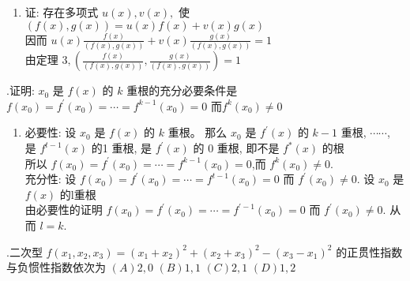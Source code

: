 \documentclass{article}
\begin{document}
\begin{enumerate}[\qquad 证：]
    \item 证: 存在多项式 $u(x), v(x),$ 使 $(f(x), g(x))=u(x) f(x)+v(x) g(x)$ \\
          因而 $u(x) \frac{f(x)}{(f(x), g(x))}+v(x) \frac{g(x)}{(f(x), g(x))}=1$ \\
          由定理 $3, \left(\frac{f(x)}{(f(x),g(x))},\frac{g(x)}{(f(x), g(x))}\right)=1$
\end{enumerate}

\vspace{1ex}
{.}证明: $x_{0}$ 是 $f(x)$ 的 $k$ 重根的充分必要条件是 $f\left(x_{0}\right)=f^{\prime}\left(x_{0}\right)=\cdots=f^{k-1}\left(x_{0}\right)=0$ 而$f^{k}\left(x_{0}\right) \neq 0$

\begin{enumerate}[\qquad 证：]
    \item {\heiti 必要性:} 设 $x_{0}$ 是 $f(x)$ 的 $k$ 重根。 那么 $x_{0}$ 是 $f^{\prime}(x)$ 的 $k-1$ 重根, $\cdots \cdots$, 是 $f^{t-1}(x)$ 的1 重根, 是 $f^{\prime}(x)$ 的 0 重根, 即不是 $f^{*}(x)$ 的根 \\
          所以 $f\left(x_{0}\right)=f^{\prime}\left(x_{0}\right)=\cdots=f^{k-1}\left(x_{0}\right)=0$,而 $f^{k}\left(x_{0}\right) \neq 0 .$ \\
          {\heiti 充分性: } 设 $f(x_{0})=f^{\prime}\left(x_{0}\right)=\cdots=f^{t-1}\left(x_{0}\right)=0$ 而 $f^{\prime}\left(x_{0}\right) \neq 0 .$ 设 $x_{0}$ 是 $f(x)$ 的l重根 \\
          由必要性的证明 $f\left(x_{0}\right)=f^{\prime}\left(x_{0}\right)=\cdots=f^{\prime-1}\left(x_{0}\right)=0$ 而 $f^{\prime}\left(x_{0}\right) \neq 0 .$ 从而 $l=k .$
\end{enumerate}

\vspace{1ex}
{.}二次型 $f\left(x_{1}, x_{2}, x_{3}\right)=\left(x_{1}+x_{2}\right)^{2}+\left(x_{2}+x_{3}\right)^{2}-\left(x_{3}-x_{1}\right)^{2}$ 的正贯性指数与负惯性指数依次为
$(A) 2,0 $ $(B) 1,1 $ $(C) 2,1 $ $(D) 1,2 $
\end{document}

